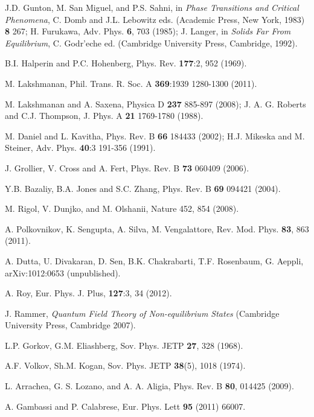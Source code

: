 \documentclass[a4paper,11pt,color]{article}
\renewenvironment{thebibliography}[1]{%
    \begin{oldthebibliography}{#1}%
      \setlength{\parskip}{0ex}%
      \setlength{\itemsep}{0ex}%
  }%
  {%
    \end{oldthebibliography}%
  }
\begin{document}
\begin{thebibliography}{}

J.D. Gunton, M. San Miguel, and P.S. Sahni, in \textit{Phase Transitions and Critical Phenomena}, C. Domb
and J.L. Lebowitz eds. (Academic Press, New York, 1983)  {\bf 8} 267; H. Furukawa, Adv. Phys. {\bf 6}, 703 (1985);
J. Langer, in \textit{Solids Far From Equilibrium}, C. Godr'eche ed. (Cambridge University Press, Cambridge, 1992).

B.I. Halperin and P.C. Hohenberg, Phys. Rev. {\bf 177}:2, 952 (1969).

M. Lakshmanan,  Phil. Trans. R. Soc. A {\bf 369}:1939 1280-1300 (2011).

M. Lakshmanan and A. Saxena, Physica D {\bf 237} 885-897 (2008); J. A. G. Roberts and C.J. Thompson, J. Phys. A {\bf 21} 1769-1780 (1988).

M. Daniel and L. Kavitha, Phys. Rev. B {\bf 66} 184433 (2002); H.J. Mikeska and M. Steiner, Adv. Phys. {\bf40}:3 191-356 (1991). 

J. Grollier, V. Cross  and A. Fert, Phys. Rev. B {\bf 73} 060409 (2006).

Y.B. Bazaliy, B.A. Jones and S.C. Zhang, Phys. Rev. B {\bf 69} 094421 (2004).

M. Rigol, V. Dunjko, and M. Olshanii, Nature 452, 854 (2008).

A. Polkovnikov, K. Sengupta, A. Silva, M. Vengalattore, Rev. Mod. Phys. \textbf{83}, 863 (2011).

A. Dutta, U. Divakaran, D. Sen, B.K. Chakrabarti, T.F. Rosenbaum, G. Aeppli, arXiv:1012:0653 (unpublished).

A. Roy, Eur. Phys. J. {Plus}, {\bf 127}:3, 34 (2012).

J. Rammer, \textit{Quantum Field Theory of Non-equilibrium States} (Cambridge University Press, Cambridge 2007).

L.P. Gorkov, G.M. Eliashberg, Sov. Phys. JETP \textbf{27}, 328 (1968).

A.F. Volkov, Sh.M. Kogan, Sov. Phys. JETP \textbf{38}(5), 1018 (1974).

L. Arrachea, G. S. Lozano, and A. A. Aligia, Phys. Rev. B {\bf 80}, 014425 (2009).

A. Gambassi and P. Calabrese, Eur. Phys. Lett {\bf 95} (2011) 66007.


\end{thebibliography}
\end{document}
